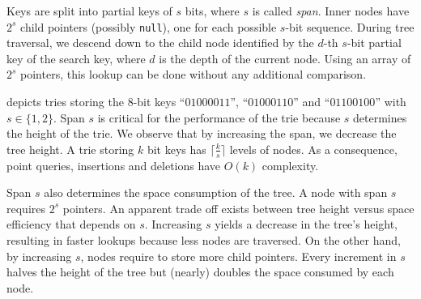 \documentclass[abstracton,12pt]{scrartcl}
\theoremstyle{definition}
\begin{document}
Keys are split into partial keys of $s$ bits, where $s$ is called 
\textit{span}. Inner nodes have  $2^s$ child pointers 
(possibly \texttt{null}), one for each possible $s$-bit sequence. During tree
traversal, we descend down to the child node identified by the $d$-th
$s$-bit partial key of the search key, where $d$ is the depth of the current 
node.  Using an array of $2^s$  pointers, this lookup can be done without any 
additional comparison. 

 depicts tries storing the 
8-bit keys ``$01000011$'', ``$01000110$'' and ``$01100100$'' with 
$s \in \{1,2\}$. Span $s$ is critical for the performance of the trie because $s$ 
determines the height of the trie. We observe that by increasing the span, 
we decrease the tree height. A trie
storing $k$ bit keys has $\lceil \frac{k}{s} \rceil$ levels of nodes.
As a consequence, point queries, insertions and deletions have 
$O(k)$ complexity.

Span $s$ also determines the space consumption of the tree.
A node with span $s$ requires $2^s$ pointers. 
An apparent trade off exists between tree height versus space efficiency that
depends on $s$. Increasing $s$ yields a decrease in the tree's height, 
resulting in faster lookups because less nodes are traversed. On the other
hand, by increasing $s$, nodes require to store more child pointers. Every
increment in $s$ halves the height of the tree but (nearly) doubles the space consumed
by each node.
\end{document}
